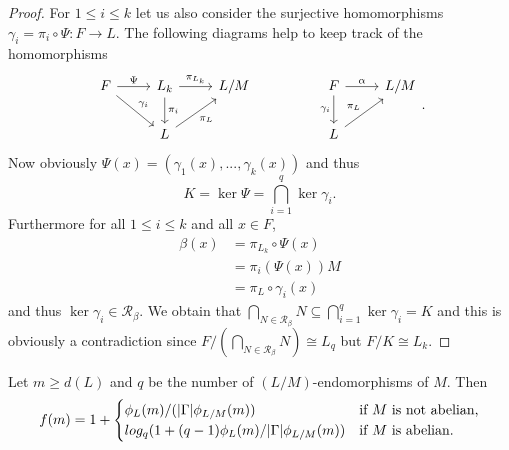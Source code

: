 \begin{proof}
    For $1 \le i \le k$ let us also consider the surjective homomorphisms $\gamma_i = \pi_i \circ \Psi \colon F \rightarrow L$.
    The following diagrams help to keep track of the homomorphisms
    $$
\begin{tikzcd}
    F \arrow[r, "\Psi"] \arrow[rd, "\gamma_i"] & L_k \arrow[d, "\pi_i"] \arrow[r, "\pi_{L_k}"] & L/M &  & F \arrow[r, "\alpha"] \arrow[d, "\gamma_i"'] & L/M \\
                                               & L \arrow[ru, "\pi_L"']                        &     &  & L \arrow[ru, "\pi_L"]                        &    
    \end{tikzcd}.
    $$
    Now obviously $\Psi(x) = (\gamma_1(x), ..., \gamma_k(x))$ and thus
    $$K = \ker \Psi = \bigcap_{i=1}^{q} \ker \gamma_i.$$
    Furthermore for all $1 \le i \le k$ and all $x \in F$,
    \begin{align*}
        \beta(x) &= \pi_{L_k} \circ \Psi(x) \\
                  &= \pi_i(\Psi(x))M \\
                  &= \pi_L \circ \gamma_i(x) 
    \end{align*}
   and thus $\ker \gamma_i \in \mathscr{R}_\beta$.
   We obtain that $\bigcap_{N \in \mathscr{R}_\beta}N \subseteq \bigcap_{i=1}^{q} \ker \gamma_i = K$ 
   and this is obviously a contradiction since 
    $F/(\bigcap_{N \in \mathscr{R}_\beta}N) \cong L_q$ but $F/K \cong L_k$. 

\end{proof}

\begin{theorem}
    Let $m \ge d(L)$ and $q$ be the number of $(L/M)$-endomorphisms of $M$. Then 
    $$
    f(m) = 1 +
    \begin{cases}
        \phi_L(m)/(| \Gamma |\phi_{L/M}(m)) & \text{if } M \text{ is not abelian,} \\
        log_q(1+(q-1)\phi_L(m)/| \Gamma |\phi_{L/M}(m)) & \text{if } M \text{ is abelian.} \\
    \end{cases}
    $$
\end{theorem}

